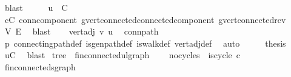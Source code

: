 \begin{isabellebody}
\ blast\isanewline
\ \ \isamarkupfalse%
\ \isamarkupfalse%
\ {\isachardoublequoteopen}u\ {\isasymin}\ C{\isachardoublequoteclose}\ \isamarkupfalse%
\ {\isacartoucheopen}c{\isasymin}C{\isacartoucheclose}\ conn{\isacharunderscore}{\kern0pt}component\ g{\isacharprime}{\kern0pt}{\isachardot}{\kern0pt}vert{\isacharunderscore}{\kern0pt}connected{\isacharunderscore}{\kern0pt}connected{\isacharunderscore}{\kern0pt}component\ g{\isacharprime}{\kern0pt}{\isachardot}{\kern0pt}vert{\isacharunderscore}{\kern0pt}connected{\isacharunderscore}{\kern0pt}rev\ \isamarkupfalse%
\ V{\isacharprime}{\kern0pt}\ E{\isacharprime}{\kern0pt}\ \isamarkupfalse%
\ blast\isanewline
\ \ \isamarkupfalse%
\ {\isachardoublequoteopen}vert{\isacharunderscore}{\kern0pt}adj\ v\ u{\isachardoublequoteclose}\ \isamarkupfalse%
\ conn{\isacharunderscore}{\kern0pt}path\ \isamarkupfalse%
\ p\ connecting{\isacharunderscore}{\kern0pt}path{\isacharunderscore}{\kern0pt}def\ is{\isacharunderscore}{\kern0pt}gen{\isacharunderscore}{\kern0pt}path{\isacharunderscore}{\kern0pt}def\ is{\isacharunderscore}{\kern0pt}walk{\isacharunderscore}{\kern0pt}def\ vert{\isacharunderscore}{\kern0pt}adj{\isacharunderscore}{\kern0pt}def\ \isamarkupfalse%
\ auto\isanewline
\ \ \isamarkupfalse%
\ \isamarkupfalse%
\ {\isacharquery}{\kern0pt}thesis\ \isamarkupfalse%
\ {\isacartoucheopen}u{\isasymin}C{\isacartoucheclose}\ \isamarkupfalse%
\ blast\isanewline
{}\isamarkupfalse%
%
\endisatagproof
{\isafoldproof}%
%
\isadelimproof
%
\endisadelimproof
%
\isadelimdocument
%
\endisadelimdocument
%
\isatagdocument
%
\isamarkuptrue%
%
\endisatagdocument
{\isafolddocument}%
%
\isadelimdocument
%
\endisadelimdocument
{}\isamarkupfalse%
\ tree\ {\isacharequal}{\kern0pt}\ fin{\isacharunderscore}{\kern0pt}connected{\isacharunderscore}{\kern0pt}ulgraph\ {\isacharplus}{\kern0pt}\isanewline
\ \ \ no{\isacharunderscore}{\kern0pt}cycles{\isacharcolon}{\kern0pt}\ {\isachardoublequoteopen}{\isasymnot}\ is{\isacharunderscore}{\kern0pt}cycle{}\ c{\isachardoublequoteclose}\isanewline
{}\isanewline
\isanewline
{}\isamarkupfalse%
\ fin{\isacharunderscore}{\kern0pt}connected{\isacharunderscore}{\kern0pt}sgraph\isanewline
%
\isadelimproof
\ \ %
\endisadelimproof
%
\isatagproof
{}\isamarkupfalse%

\end{isabellebody}
